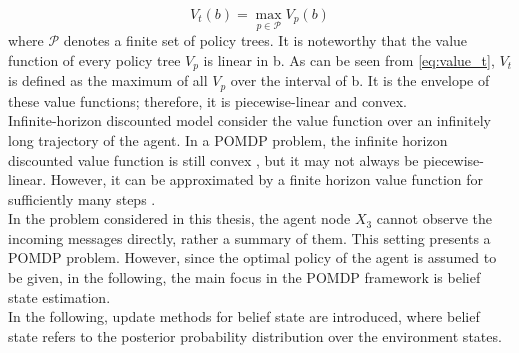 \begin{equation}
V_{t}(b)=\max _{p \in \mathcal{P}} V_p(b)
\label{eq:value_t}
\end{equation}
where $ \mathcal{P} $ denotes a finite set of policy trees.
It is noteworthy that the value function of every policy tree $ V_p $ is linear in b. As can be seen from \autoref{eq:value_t}, $ V_t $ is defined as the maximum of all $ V_p $ over the interval of b. It is the envelope of these value functions; therefore, it is piecewise-linear and convex.\\
Infinite-horizon discounted model consider the value function over an infinitely long trajectory of the agent. In a POMDP problem, the infinite horizon discounted value function is still convex \cite{White1980}, but it may not always be piecewise-linear. However, it can be approximated by a finite horizon value function for sufficiently many steps \cite{Sawaki1978, Edward2019}.\\
In the problem considered in this thesis, the agent node $ X_{3} $ cannot observe the incoming messages directly, rather a summary of them. This setting presents a POMDP problem. However, since the optimal policy of the agent is assumed to be given, in the following, the main focus in the POMDP framework is belief state estimation. \\
In the following, update methods for belief state are introduced, where belief state refers to the posterior probability distribution over the environment states.

